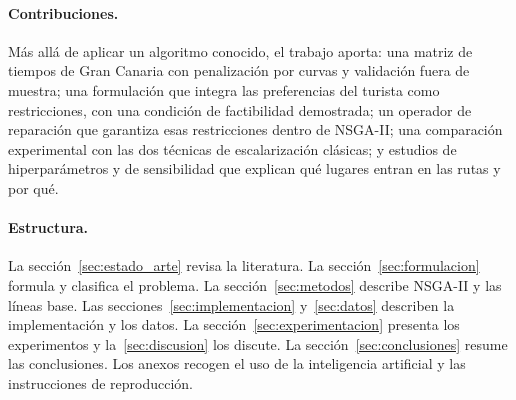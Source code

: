 \paragraph{Contribuciones.} Más allá de aplicar un algoritmo conocido, el trabajo aporta: una matriz de tiempos de Gran Canaria con penalización por curvas y validación fuera de muestra; una formulación que integra las preferencias del turista como restricciones, con una condición de factibilidad demostrada; un operador de reparación que garantiza esas restricciones dentro de NSGA-II; una comparación experimental con las dos técnicas de escalarización clásicas; y estudios de hiperparámetros y de sensibilidad que explican qué lugares entran en las rutas y por qué.

\paragraph{Estructura.} La sección~\ref{sec:estado_arte} revisa la literatura. La sección~\ref{sec:formulacion} formula y clasifica el problema. La sección~\ref{sec:metodos} describe NSGA-II y las líneas base. Las secciones~\ref{sec:implementacion} y~\ref{sec:datos} describen la implementación y los datos. La sección~\ref{sec:experimentacion} presenta los experimentos y la~\ref{sec:discusion} los discute. La sección~\ref{sec:conclusiones} resume las conclusiones. Los anexos recogen el uso de la inteligencia artificial y las instrucciones de reproducción.
